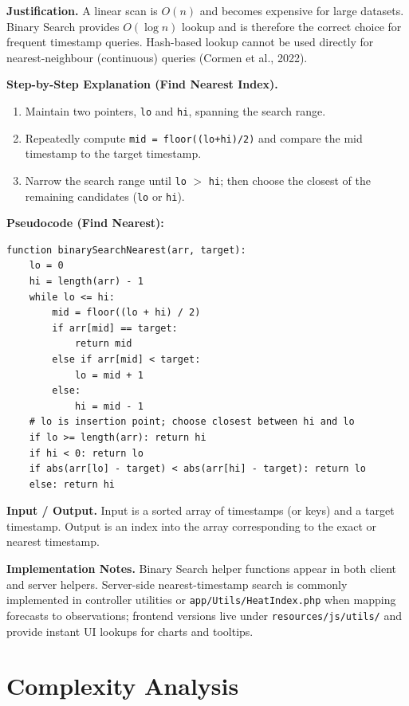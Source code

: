 \documentclass[12pt]{article}
\begin{document}
\noindent\textbf{Justification.} A linear scan is $O(n)$ and becomes expensive for large datasets. Binary Search provides $O(\log n)$ lookup and is therefore the correct choice for frequent timestamp queries. Hash-based lookup cannot be used directly for nearest-neighbour (continuous) queries (Cormen et al., 2022).

\noindent\textbf{Step-by-Step Explanation (Find Nearest Index).}
\begin{enumerate}
    \item Maintain two pointers, \texttt{lo} and \texttt{hi}, spanning the search range.
    \item Repeatedly compute \texttt{mid = floor((lo+hi)/2)} and compare the mid timestamp to the target timestamp.
    \item Narrow the search range until \texttt{lo} $>$ \texttt{hi}; then choose the closest of the remaining candidates (\texttt{lo} or \texttt{hi}).
\end{enumerate}

\noindent\textbf{Pseudocode (Find Nearest):}
\begin{lstlisting}[language=Pseudocode, caption={Binary Search for nearest timestamp}]
function binarySearchNearest(arr, target):
    lo = 0
    hi = length(arr) - 1
    while lo <= hi:
        mid = floor((lo + hi) / 2)
        if arr[mid] == target:
            return mid
        else if arr[mid] < target:
            lo = mid + 1
        else:
            hi = mid - 1
    # lo is insertion point; choose closest between hi and lo
    if lo >= length(arr): return hi
    if hi < 0: return lo
    if abs(arr[lo] - target) < abs(arr[hi] - target): return lo
    else: return hi
\end{lstlisting}

\noindent\textbf{Input / Output.} Input is a sorted array of timestamps (or keys) and a target timestamp. Output is an index into the array corresponding to the exact or nearest timestamp.

\newpage
\noindent\textbf{Implementation Notes.} Binary Search helper functions appear in both client and server helpers. Server-side nearest-timestamp search is commonly implemented in controller utilities or \texttt{app/Utils/HeatIndex.php} when mapping forecasts to observations; frontend versions live under \texttt{resources/js/utils/} and provide instant UI lookups for charts and tooltips.

\section{Complexity Analysis}
\end{document}
